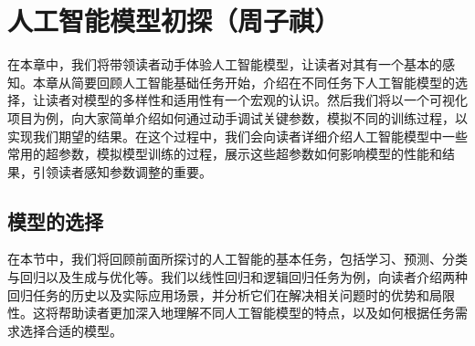 \chapter{人工智能模型初探（周子祺）}
在本章中，我们将带领读者动手体验人工智能模型，让读者对其有一个基本的感知。本章从简要回顾人工智能基础任务开始，介绍在不同任务下人工智能模型的选择，让读者对模型的多样性和适用性有一个宏观的认识。然后我们将以一个可视化项目为例，向大家简单介绍如何通过动手调试关键参数，模拟不同的训练过程，以实现我们期望的结果。在这个过程中，我们会向读者详细介绍人工智能模型中一些常用的超参数，模拟模型训练的过程，展示这些超参数如何影响模型的性能和结果，引领读者感知参数调整的重要。

\section{模型的选择}

在本节中，我们将回顾前面所探讨的人工智能的基本任务，包括学习、预测、分类与回归以及生成与优化等。我们以线性回归和逻辑回归任务为例，向读者介绍两种回归任务的历史以及实际应用场景，并分析它们在解决相关问题时的优势和局限性。这将帮助读者更加深入地理解不同人工智能模型的特点，以及如何根据任务需求选择合适的模型。

